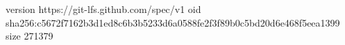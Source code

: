 version https://git-lfs.github.com/spec/v1
oid sha256:c5672f7162b3d1ed8c6b3b5233d6a0588fe2f3f89b0c5bd20d6e468f5eea1399
size 271379
